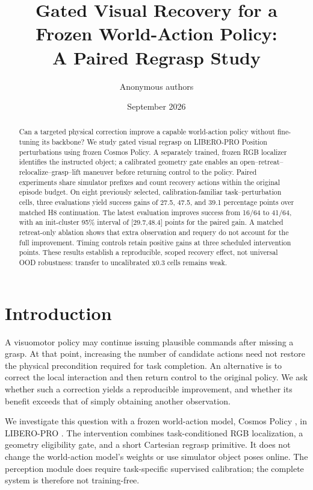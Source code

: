 \documentclass{article}
\title{Gated Visual Recovery for a Frozen World-Action Policy:\\A Paired Regrasp Study}
\author{Anonymous authors}
\date{September 2026}
\begin{document}
\maketitle
\begin{abstract}
Can a targeted physical correction improve a capable world-action policy
without fine-tuning its backbone? We study gated visual regrasp on
LIBERO-PRO Position perturbations using frozen Cosmos Policy. A separately
trained, frozen RGB localizer identifies the instructed object; a calibrated
geometry gate enables an open--retreat--relocalize--grasp--lift maneuver before
returning control to the policy. Paired experiments share simulator prefixes
and count recovery actions within the original episode budget. On eight
previously selected, calibration-familiar task--perturbation cells, three
evaluations yield success gains of 27.5, 47.5, and 39.1 percentage points
over matched H8 continuation. The latest evaluation improves success from
16/64 to 41/64, with an init-cluster 95\% interval of [29.7,48.4] points
for the paired gain. A matched retreat-only ablation shows that extra
observation and requery do not account for the full improvement. Timing
controls retain positive gains at three scheduled intervention points.
These results establish a reproducible, scoped recovery effect, not
universal OOD robustness: transfer to uncalibrated x0.3 cells remains weak.
\end{abstract}

\section{Introduction}
A visuomotor policy may continue issuing plausible commands after missing a
grasp. At that point, increasing the number of candidate actions need not
restore the physical precondition required for task completion. An alternative
is to correct the local interaction and then return control to the original
policy. We ask whether such a correction yields a reproducible improvement,
and whether its benefit exceeds that of simply obtaining another observation.

We investigate this question with a frozen world-action model,
Cosmos Policy \citep{cosmos_policy}, in LIBERO-PRO \citep{libero_pro}.
The intervention combines task-conditioned RGB localization, a geometry
eligibility gate, and a short Cartesian regrasp primitive. It does not change
the world-action model's weights or use simulator object poses online.
The perception module does require task-specific supervised calibration;
the complete system is therefore not training-free.
\end{document}
